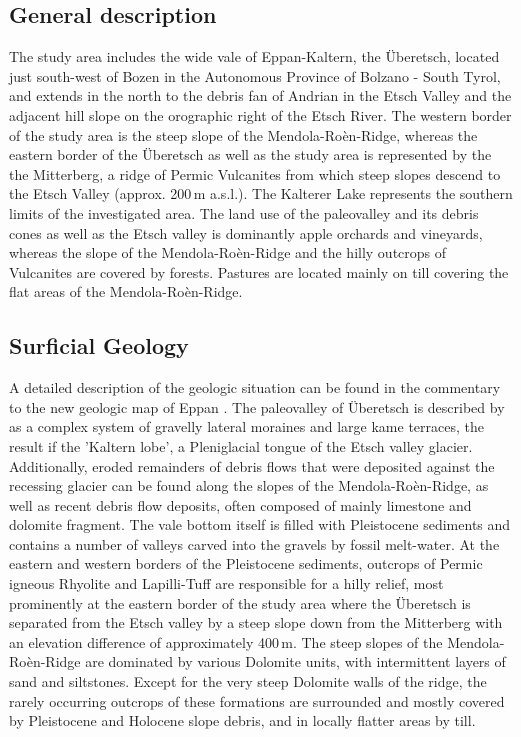\documentclass[preprint,12pt,authoryear]{elsarticle}
\begin{document}
\subsection{General description}
The study area includes the wide vale of Eppan-Kaltern, the {\"U}beretsch, located just south-west of Bozen in the Autonomous Province of Bolzano - South Tyrol, and extends in the north to the debris fan of Andrian in the Etsch Valley and the adjacent hill slope on the orographic right of the Etsch River. The western border of the study area is the steep slope of the Mendola-Ro\`en-Ridge, whereas the eastern border of the {\"U}beretsch as well as the study area is represented by the the Mitterberg, a ridge of Permic Vulcanites from which steep slopes descend to the Etsch Valley (approx. 200\,m a.s.l.). The Kalterer Lake represents the southern limits of the investigated area. The land use of the paleovalley and its debris cones as well as the Etsch valley is dominantly apple orchards and vineyards, whereas the slope of the  Mendola-Ro\`en-Ridge and the hilly outcrops of Vulcanites are covered by forests. Pastures are located mainly on till covering the flat areas of the  Mendola-Ro\`en-Ridge. 
\subsection{Surficial Geology}
A detailed  description of the geologic situation can be found in the commentary to the new geologic map of Eppan \citep{Avanzini2006}. 
The paleovalley of {\"U}beretsch is described by \cite{Scholz2005} as a complex system of gravelly lateral moraines and large kame terraces, the result if the 'Kaltern lobe', a Pleniglacial tongue of the Etsch valley glacier. Additionally, eroded remainders of debris flows that were deposited against the recessing glacier can be found along the slopes of the Mendola-Ro\`en-Ridge, as well as recent debris flow deposits, often composed of mainly limestone and dolomite fragment. The vale bottom itself is filled with Pleistocene sediments and contains a  number of valleys carved into the gravels by fossil melt-water. At the eastern and western borders of the Pleistocene sediments, outcrops of Permic igneous Rhyolite and Lapilli-Tuff are responsible for a hilly relief, most prominently at the eastern border of the study area where the {\"U}beretsch is separated from the Etsch valley by a steep slope down from the Mitterberg with an elevation difference of approximately 400\,m.   
The steep slopes of the Mendola-Ro\`en-Ridge are dominated by various Dolomite units, with intermittent layers of sand and siltstones. Except for the very steep Dolomite walls of the ridge, the rarely occurring outcrops of these formations are surrounded and mostly covered by Pleistocene and Holocene slope debris, and in locally flatter areas by till. 
 
\end{document}
